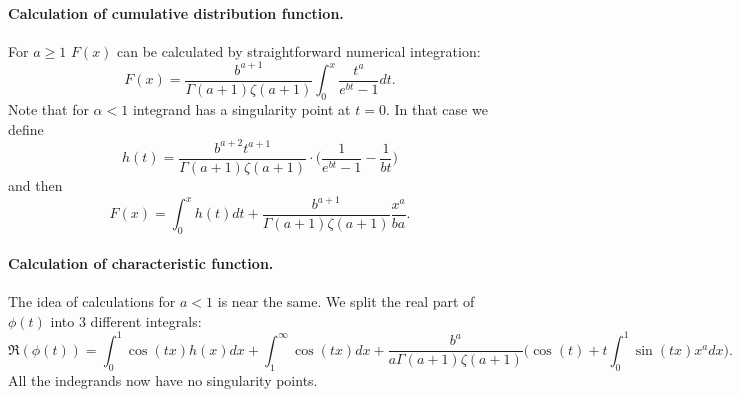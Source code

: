 \documentclass[a4paper,11pt]{article}
\theoremstyle{plain}
\theoremstyle{definition}
\begin{document}
    \paragraph{Calculation of cumulative distribution function.} For $a \geq 1$ $F(x)$ can be calculated by straightforward numerical integration:
    \[
    F(x) = \frac{b^{a+1}}{\Gamma(a+1)\zeta(a+1)} \int_{0}^{x} \frac{t ^ a}{e^{bt} - 1} dt.
    \]
    Note that for $\alpha < 1$ integrand has a singularity point at $t=0$. In that case we define
    \[
    h(t) = \frac{b^{a+2}t ^ {a+1} }{\Gamma(a+1)\zeta(a+1)} \cdot \bigg( \frac{1}{e^{bt} -  1}-\frac{1}{bt}\bigg)
    \]
    and then
    \[
    F(x) = \int_{0}^{x}  h(t) dt + \frac{b^{a+1}}{\Gamma(a+1)\zeta(a+1)} \frac{x^a}{ba}.
    \]
	
	\paragraph{Calculation of characteristic function.} The idea of calculations for $a < 1$ is near the same. We split the real part of $\phi(t)$ into $3$ different integrals:
	\[
	\Re(\phi(t)) = \int_{0}^{1} \cos(tx) h(x) dx + \int_{1}^{\infty} \cos(tx) dx + \frac{b^{a}}{a\Gamma(a+1)\zeta(a+1)} \bigg(\cos(t) + t\int_{0}^{1} \sin(tx)x^a dx \bigg).
	\]
	All the indegrands now have no singularity points.
	
	\pagebreak
\end{document}

